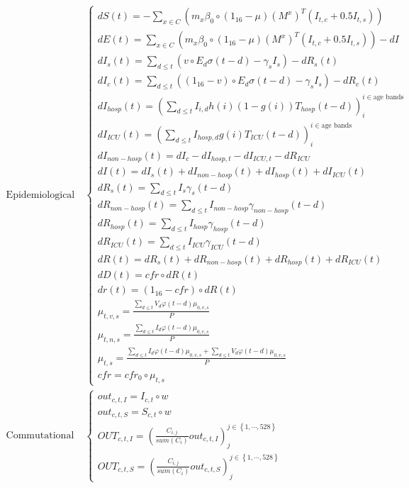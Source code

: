 \documentclass[12pt]{article}
\newcommand{\set}[1]{\left\{ #1 \right\}}
\newcommand{\vect}[1]{\left( #1 \right)}
\begin{document}
\begin{align*}
     \text{Epidemiological} \ & \begin{cases}
     dS(t) = - \sum_{x \in C} \vect{m_x \beta_0 \circ \vect{1_{16} - \mu} \vect{M^x}^T \vect{I_{t,c} + 0.5I_{t,s}}}\\
        dE(t) = \sum_{x \in C} \vect{m_x \beta_0 \circ \vect{1_{16} - \mu} \vect{M^x}^T \vect{I_{t,c} + 0.5I_{t,s}}} - dI\\
        dI_s(t) = \sum_{d \leq t} \vect{v \circ E_d \sigma (t - d) - \gamma_{s}I_s} - dR_s(t)\\
         dI_c(t) = \sum_{d \leq t} \vect{ \vect{1_{16} - v} \circ E_d \sigma (t - d) - \gamma_{s}I_s} - dR_c(t)\\
        dI_{hosp} (t) =  \vect{\sum_{d \leq t} I_{i,d} h(i) \vect{1 - g(i)}  T_{hosp}(t - d) }_{i}^{i \in \text{age bands}}\\
        dI_{ICU}(t) = \vect{\sum_{d \leq t} I_{hosp, d} g(i) T_{ICU}(t - d) }_{i}^{i \in \text{age bands}}\\
         dI_{non-hosp}(t) =  d I_{c} - d I_{hosp,  t}- d I_{ICU, t} - dR_{ICU}\\
         dI(t) = dI_s(t) + dI_{non-hosp}(t) + dI_{hosp}(t) + dI_{ICU}(t)\\
         d R_{s}(t) = \sum_{d \leq t} I_s\gamma_s(t-d)\\
         d R_{non-hosp}(t) = \sum_{d \leq t} I_{non-hosp} \gamma_{non-hosp}(t-d)\\
         d R_{hosp}(t) = \sum_{d \leq t} I_{hosp} \gamma_{hosp}(t-d)\\
         d R_{ICU}(t) = \sum_{d \leq t} I_{ICU} \gamma_{ICU}(t-d)\\
         dR(t) = dR_s (t) + d R_{non-hosp}(t) +d R_{hosp}(t) + d R_{ICU}(t)\\
    d D (t) = cfr \circ dR(t)\\
    d r (t) = \vect{1_{16} - cfr} \circ dR(t)\\
     \mu_{t,v,s} = \frac{\sum_{d \leq t} V_d \varphi(t - d)\mu_{0,v,s}}{P}\\
         \mu_{t,n,s} = \frac{\sum_{d \leq t} I_d \varphi(t - d)\mu_{0,v,s}}{P}\\
         \mu_{t,s} = \frac{\sum_{d \leq t} I_d \varphi(t - d)\mu_{0,v,s} +  \sum_{d \leq t} V_d \varphi(t - d)\mu_{0,v,s}}{P}\\
         cfr = cfr_0 \circ \mu_{t,s}
     \end{cases}\\
     \text{Commutational} \ & \begin{cases}
     out_{c,t, I} = {I_{c,t} \circ w}\\
        out_{c,t, S} = {S_{c,t} \circ w}\\
        OUT_{c,t,I} = \vect{\frac{C_{i,j}}{sum\vect{C_i}} out_{c,t,I}}_{j}^{j \in \set{1, \cdots, 528}}\\
        OUT_{c,t,S} = \vect{\frac{C_{i,j}}{sum\vect{C_i}} out_{c,t,S}}_{j}^{j \in \set{1, \cdots, 528}}
     \end{cases}
\end{align*}
\end{document}
